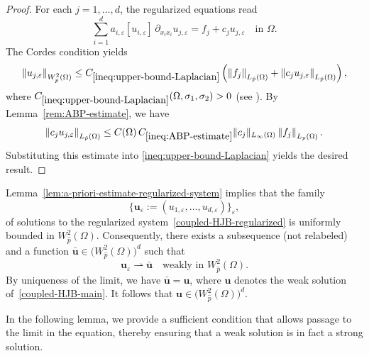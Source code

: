 \documentclass[final,onefignum,onetabnum]{mousaviart}
\begin{document}
	\begin{proof}
	For each $j = 1,\dots,d$, the regularized equations read
	\begin{equation}
		\label{eq:laplacian}
		\sum_{i=1}^{d}
		a_{i,\varepsilon}[u_{i,\varepsilon}]\,
		\partial_{x_i x_i} u_{j,\varepsilon}
		=
		f_j + c_j u_{j,\varepsilon}
		\quad \text{in } \Omega.
	\end{equation}
	The Cordes condition yields
	\begin{equation}
		\label{ineq:upper-bound-Laplacian}
		\left\| u_{j,\varepsilon} \right\|_{W^{2}_{\hat{p}}(\Omega)}
		\le
		C_{\ref{ineq:upper-bound-Laplacian}}
		\left(
		\left\| f_j \right\|_{L_{\hat{p}}(\Omega)}
		+
		\left\| c_j u_{j,\varepsilon} \right\|_{L_{\hat{p}}(\Omega)}
		\right),
	\end{equation}
	where $C_{\ref{ineq:upper-bound-Laplacian}}(\Omega, \sigma_1,\sigma_2)>0$ (see \cite[Theorem~1.2.3]{maugeri2000elliptic}).
	By Lemma~\ref{rem:ABP-estimate}, we have
	\[
	\left\| c_j u_{j,\varepsilon} \right\|_{L_{\hat{p}}(\Omega)}
	\le
	C(\Omega)\,
	C_{\ref{ineq:ABP-estimate}}
	\|c_j\|_{L_{\infty}(\Omega)}
	\left\| f_j \right\|_{L_p(\Omega)}.
	\]
	Substituting this estimate into \eqref{ineq:upper-bound-Laplacian} yields the desired result.
	\end{proof}
	\begin{remark}
	\label{rem:W2-regularity-weak-solution}
	Lemma~\ref{lem:a-priori-estimate-regularized-system} implies that the family
	\[
	\{ \boldsymbol{u}_{\varepsilon} := (u_{1,\varepsilon}, \dots, u_{d,\varepsilon}) \}_{\varepsilon},
	\]
	of solutions to the regularized system~\eqref{coupled-HJB-regularized} is uniformly bounded in $W^{2}_{\hat{p}}(\Omega)$. Consequently, there exists a subsequence (not relabeled) and a function $\bar{\boldsymbol{u}} \in \bigl(W^{2}_{\hat{p}}(\Omega)\bigr)^d$ such that
	\[
	\boldsymbol{u}_{\varepsilon} \rightharpoonup \bar{\boldsymbol{u}}
	\quad \text{weakly in } W^{2}_{\hat{p}}(\Omega).
	\]
	By uniqueness of the limit, we have $\bar{\boldsymbol{u}} = \boldsymbol{u}$, where $\boldsymbol{u}$ denotes the weak solution of~\eqref{coupled-HJB-main}. It follows that $\boldsymbol{u} \in \bigl(W^{2}_{\hat{p}}(\Omega)\bigr)^d$.
	\end{remark}
	In the following lemma, we provide a sufficient condition that allows passage to the limit in the equation, thereby ensuring that a weak solution is in fact a strong solution.
\end{document}
